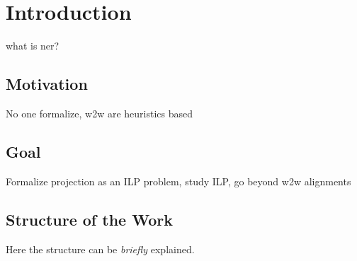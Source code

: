 \chapter{Introduction}
\label{sec:introduction}
what is ner?

\section{Motivation}
No one formalize, w2w are heuristics based

\section{Goal}
Formalize projection as an ILP problem, study ILP, go beyond w2w alignments

\section{Structure of the Work}
Here the structure can be \emph{briefly} explained.
